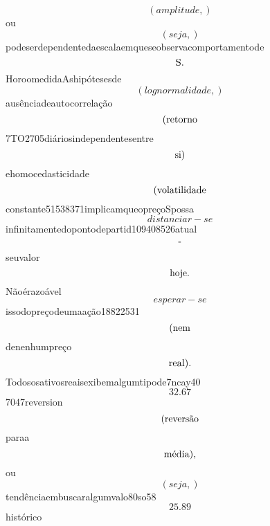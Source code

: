 \documentclass{article}
\begin{document}
\begin{equation}
\left( amplitude,\right)
\end{equation}ou\begin{equation}
\left( seja,\right)
\end{equation}podeserdependentedaescalaemqueseobservacomportamentode\begin{equation}
$S.$
\end{equation}HoroomedidaAshipótesesde\begin{equation}
\left( lognormalidade,\right)
\end{equation}ausênciadeautocorrelação\begin{equation}
$(retorno$
\end{equation}7TO2705diáriosindependentesentre\begin{equation}
$si)$
\end{equation}ehomocedasticidade\begin{equation}
$(volatilidade$
\end{equation}constante51538371implicamqueopreçoSpossa\begin{equation}
distanciar - se
\end{equation}infinitamentedopontodepartid109408526atual\begin{equation}
$-$
\end{equation}seuvalor\begin{equation}
$hoje.$
\end{equation}Nãoérazoável\begin{equation}
esperar - se
\end{equation}issodopreçodeumaação18822531\begin{equation}
$(nem$
\end{equation}denenhumpreço\begin{equation}
$real).$
\end{equation}Todososativosreaisexibemalgumtipode7ncay40\begin{equation}
32.67
\end{equation}7047reversion\begin{equation}
$(reversão$
\end{equation}paraa\begin{equation}
$média),$
\end{equation}ou\begin{equation}
\left( seja,\right)
\end{equation}tendênciaembuscaralgumvalo80so58\begin{equation}
25.89
\end{equation}histórico\begin{equation}

\end{equation}
\end{document}
